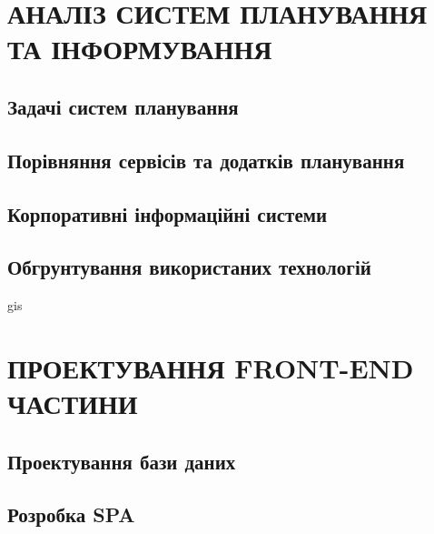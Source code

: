 \documentclass[a4paper,14pt]{extarticle} %
\begin{document}


\tableofcontents %
\clearpage


\section{АНАЛІЗ СИСТЕМ ПЛАНУВАННЯ ТА ІНФОРМУВАННЯ}

\subsection{Задачі систем планування} 

\subsection{Порівняння сервісів та додатків планування} 





\subsection{Корпоративні інформаційні системи} 



\subsection{Обгрунтування використаних технологій} 

gis




\section{ПРОЕКТУВАННЯ FRONT-END ЧАСТИНИ}

\subsection{Проектування бази даних}






\subsection{Розробка SPA}


\end{document}
